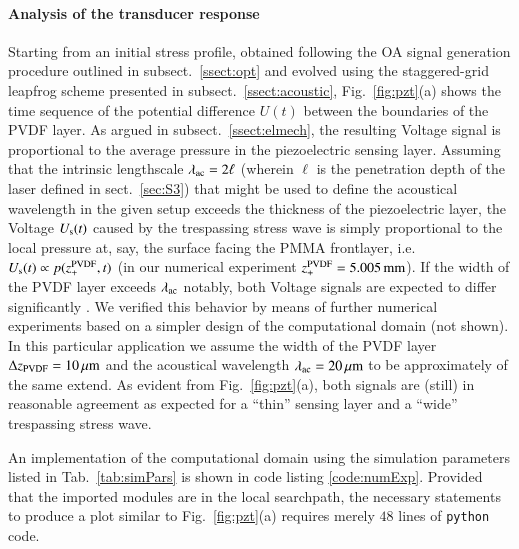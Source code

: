 \documentclass[5p,times,twocolumn]{elsarticle}
\begin{document}
\paragraph{Analysis of the transducer response}
Starting from an initial stress profile, obtained following the OA signal
generation procedure outlined in subsect.\ \ref{ssect:opt} and evolved using the
staggered-grid leapfrog scheme presented in subsect.\ \ref{ssect:acoustic},
Fig.\ \ref{fig:pzt}(a) shows the time sequence of the potential difference
$U(t)$ between the boundaries of the PVDF layer.  As argued in subsect.\
\ref{ssect:elmech}, the resulting Voltage signal is proportional to the average
pressure in the piezoelectric sensing layer.  Assuming that the intrinsic
lengthscale $\lambda_{\rm{ac}} = 2 \ell$ (wherein $\ell$ is the penetration
depth of the laser defined in sect.\ \ref{sec:S3}) that might be used to define
the acoustical wavelength in the given setup exceeds the thickness of the
piezoelectric layer, the Voltage $U_{\rm{s}}(t)$ caused by the
trespassing stress wave is simply proportional to the local pressure at, say,
the surface facing the PMMA frontlayer, i.e.\ $U_{\rm{s}}(t)\propto
p(z^{\rm{PVDF}}_{+},t)$ \cite{Schoeffmann:1988,Jaeger:2005} (in our numerical
experiment $z^{\rm{PVDF}}_{+}=5.005\,{\rm{mm}}$). If the width of the PVDF
layer exceeds $\lambda_{\rm{ac}}$ notably, both Voltage signals are expected to
differ significantly \cite{Schoeffmann:1988}. We verified this behavior by
means of further numerical experiments based on a simpler design of the
computational domain (not shown).  In this particular application we assume the
width of the PVDF layer $\Delta z_{\rm{PVDF}}=10\,{\rm{\mu m}}$ and the
acoustical wavelength $\lambda_{\rm{ac}}=20\,{\rm{\mu m}}$ to be approximately
of the same extend. As evident from Fig.\ \ref{fig:pzt}(a), both signals are
(still) in reasonable agreement as expected for a ``thin'' sensing layer and a
``wide'' trespassing stress wave.


An implementation of the computational domain using the simulation parameters
listed in Tab.\ \ref{tab:simPars} is shown in code listing \ref{code:numExp}.
Provided that the imported modules are in the local searchpath, the necessary
statements to produce a plot similar to Fig.\ \ref{fig:pzt}(a) requires merely
$48$ lines of {\tt{python}} code.
\end{document}

